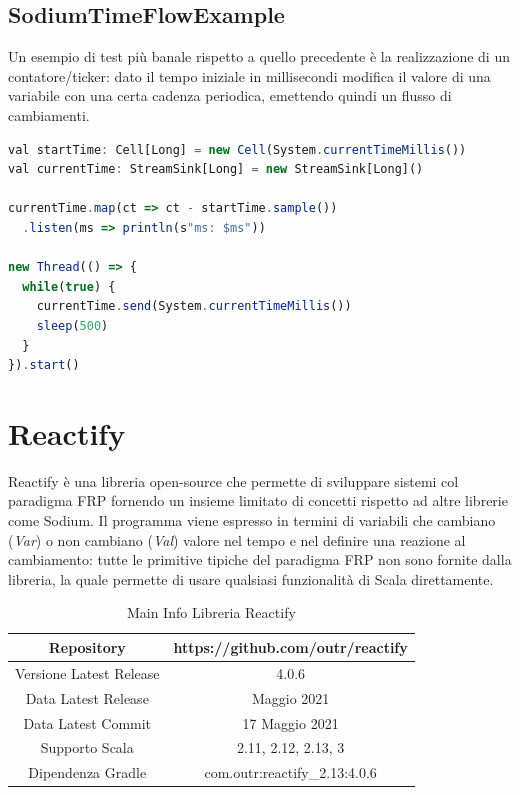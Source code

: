 \documentclass[../main.tex]{subfiles}
\begin{document}
\subsection{SodiumTimeFlowExample}
Un esempio di test più banale rispetto a quello precedente è la realizzazione di un contatore/ticker: dato il tempo iniziale in millisecondi modifica il valore di una variabile con una certa cadenza periodica, emettendo quindi un flusso di cambiamenti.

\begin{lstlisting}[language=Javascript, caption=Sodium - Esempio completo]
val startTime: Cell[Long] = new Cell(System.currentTimeMillis())
val currentTime: StreamSink[Long] = new StreamSink[Long]()

currentTime.map(ct => ct - startTime.sample())
  .listen(ms => println(s"ms: $ms"))

new Thread(() => {
  while(true) {
    currentTime.send(System.currentTimeMillis())
    sleep(500)
  }
}).start()
\end{lstlisting}

\section{Reactify}
Reactify è una libreria open-source che permette di sviluppare sistemi col paradigma FRP fornendo un insieme limitato di concetti rispetto ad altre librerie come Sodium. Il programma viene espresso in termini di variabili che cambiano (\textit{Var}) o non cambiano (\textit{Val}) valore nel tempo e nel definire una reazione al cambiamento: tutte le primitive tipiche del paradigma FRP non sono fornite dalla libreria, la quale permette di usare qualsiasi funzionalità di Scala direttamente.

\begin{table}[H]
\centering
\begin{tabular}{|c|c|}
     \hline
     Repository & https://github.com/outr/reactify \\
     \hline
     Versione Latest Release & 4.0.6 \\
     \hline
     Data Latest Release & Maggio 2021 \\
     \hline
     Data Latest Commit & 17 Maggio 2021 \\
     \hline
     Supporto Scala & 2.11, 2.12, 2.13, 3 \\
     \hline
     Dipendenza Gradle & com.outr:reactify\_2.13:4.0.6 \\
     \hline
\end{tabular}
\caption{Main Info Libreria Reactify}
\end{table}
\end{document}
